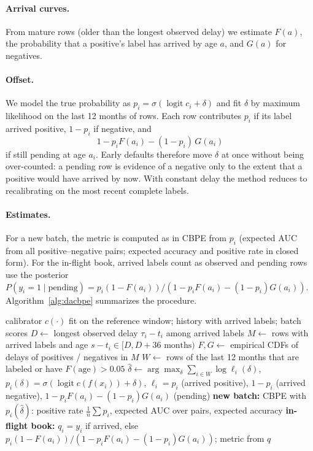 \documentclass[11pt]{article}
\begin{document}
\paragraph{Arrival curves.} From mature rows (older than the longest observed delay) we
estimate $F(a)$, the probability that a positive's label has arrived by age $a$, and $G(a)$
for negatives.

\paragraph{Offset.} We model the true probability as $p_i = \sigma(\operatorname{logit} c_i +
\delta)$ and fit $\delta$ by maximum likelihood on the last 12 months of rows. Each row
contributes $p_i$ if its label arrived positive, $1-p_i$ if negative, and
\[ 1 - p_i F(a_i) - (1-p_i)\, G(a_i) \]
if still pending at age $a_i$. Early defaults therefore move $\delta$ at once without being
over-counted: a pending row is evidence of a negative only to the extent that a positive would
have arrived by now. With constant delay the method reduces to recalibrating on the most recent
complete labels.

\paragraph{Estimates.} For a new batch, the metric is computed as in CBPE from $p_i$ (expected
AUC from all positive--negative pairs; expected accuracy and positive rate in closed form). For
the in-flight book, arrived labels count as observed and pending rows use the posterior
$P(y_i = 1 \mid \text{pending}) = p_i(1-F(a_i)) / (1 - p_i F(a_i) - (1-p_i) G(a_i))$.
Algorithm~\ref{alg:dacbpe} summarizes the procedure.

\begin{algorithm}[t]
\caption{Delay-adjusted CBPE at decision time $s$}
\label{alg:dacbpe}
\begin{algorithmic}[1]
\Require calibrator $c(\cdot)$ fit on the reference window; history with arrived labels; batch scores
\State $D \gets$ longest observed delay $\tau_i - t_i$ among arrived labels
\State $M \gets$ rows with arrived labels and age $s - t_i \in [D, D + 36\text{ months})$ 
\State $F, G \gets$ empirical CDFs of delays of positives / negatives in $M$
\State $W \gets$ rows of the last 12 months that are labeled or have $F(\text{age}) > 0.05$
\State $\hat\delta \gets \arg\max_\delta \sum_{i \in W} \log \ell_i(\delta)$, \quad $p_i(\delta) = \sigma(\operatorname{logit} c(f(x_i)) + \delta)$,
\Statex \hspace{\algorithmicindent} $\ell_i = p_i$ (arrived positive), $1 - p_i$ (arrived negative), $1 - p_i F(a_i) - (1 - p_i) G(a_i)$ (pending)
\State \textbf{new batch:} CBPE with $p_i(\hat\delta)$: positive rate $\frac{1}{n}\sum p_i$, expected AUC over pairs, expected accuracy
\State \textbf{in-flight book:} $q_i = y_i$ if arrived, else $p_i(1 - F(a_i)) / (1 - p_i F(a_i) - (1-p_i) G(a_i))$; metric from $q$
\end{algorithmic}
\end{algorithm}
\end{document}
